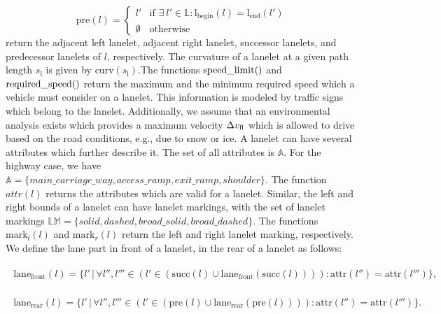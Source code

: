 \begin{equation}
\mathrm{pre}(l) =
\begin{cases} 
l' & \text{if } \exists \ l' \in \mathbb{L}: \mathrm{l}_\mathrm{begin}(l) = \mathrm{l}_\mathrm{end}(l') \\ 
\emptyset & \text{otherwise} 
\end{cases}	
\end{equation}
return the adjacent left lanelet, adjacent right lanelet, successor lanelets, and predecessor lanelets of $l$, respectively. The curvature of a lanelet at a given path length $s_\mathrm{l}$ is given by $\mathrm{curv}(s_\mathrm{l})$.The functions $\operatorname*{speed\_limit}()$ and $\operatorname*{required\_speed}()$ return the maximum and the minimum required speed which a vehicle must consider on a lanelet. This information is modeled by traffic signs which belong to the lanelet. Additionally, we assume that an environmental analysis exists which provides a maximum velocity $\Delta v_\text{fl}$ which is allowed to drive based on the road conditions, e.g., due to snow or ice. A lanelet can have several attributes which further describe it. The set of all attributes is $\mathbb{A}$.  For the highway case, we have $\mathbb{A} =  \{ main\_carriage\_way, access\_ramp, exit\_ramp, shoulder \}$. The function $attr(l)$ returns the attributes which are valid for a lanelet. Similar, the left and right bounds of a lanelet can have lanelet markings, with the set of lanelet markings $\mathbb{LM} = \{solid, dashed, broad\_solid, broad\_dashed \}$. The functions $\mathrm{mark}_l(l)$ and $\mathrm{mark}_r(l)$ return the left and right lanelet marking, respectively.
We define the lane part in front of a lanelet, in the rear of a lanelet as follows:


\begin{align}
\begin{split}
\mathrm{lane}_\mathrm{front}(l) =  \big\{l' \, \big| \, \forall l'', l''' \in (l' \in (\mathrm{succ}(l) \cup \mathrm{lane}_\mathrm{front}(\mathrm{succ}(l)))): \mathrm{attr}(l'') = \mathrm{attr}(l''')  \big\},
\end{split}
\end{align}

\begin{align}
\begin{split}
\mathrm{lane}_\mathrm{rear}(l) =  \big\{l' \, \big| \, \forall l'', l''' \in (l' \in (\mathrm{pre}(l) \cup \mathrm{lane}_\mathrm{rear}(\mathrm{pre}(l)))): \mathrm{attr}(l'') = \mathrm{attr}(l''')  \big\}.
\end{split}
\end{align}


